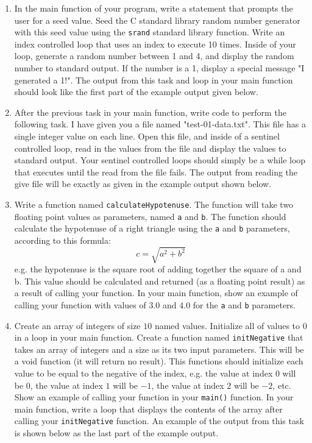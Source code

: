 \documentclass[11pt]{article}
\begin{document}
\begin{enumerate}
\item In the main function of your program, write a statement that
prompts the user for a seed value.  Seed the C standard library
random number generator with this seed value using the \verb~srand~
standard library function.  Write an index controlled loop that
uses an index to execute 10 times.  Inside of your loop, generate a
random number between 1 and 4, and display the random number to
standard output.  If the number is a 1, display a special message
"I generated a 1!".  The output from this task and loop in your
main function should look like the first part of the example
output given below.

\item After the previous task in your main function, write code to
perform the following task.  I have given you a file named
"test-01-data.txt".  This file has a single integer value
on each line.  Open this file, and inside of a sentinel 
controlled loop, read in the values from the file and
display the values to standard output.  Your sentinel
controlled loops should simply be a while loop that executes
until the read from the file fails.  The output from
reading the give file will be exactly as given in 
the example output shown below.

\item Write a function named \verb~calculateHypotenuse~.  The function 
 will take two floating point values as parameters, named \verb~a~
 and \verb~b~.  The function should calculate the hypotenuse of 
 a right triangle using the \verb~a~ and \verb~b~ parameters, according
 to this formula:
$$
  c = \sqrt{a^2 + b^2}
  $$
e.g. the hypotenuse is the square root of adding together the
square of a and b.  This value should be calculated and returned
(as a floating point result) as a result of calling your function.
In your main function, show an example of calling your function with
values of $3.0$ and $4.0$ for the \verb~a~ and \verb~b~ parameters.

\item Create an array of integers of size $10$ named values.  Initialize
all of values to $0$ in a loop in your main function.  Create a
function named \verb~initNegative~ that takes an array of integers
and a size as its two input parameters.  This will be a void
function (it will return no result).  This functions
should initialize each value to be equal to the negative
of the index, e.g. the value at index $0$ will be $0$, the
value at index $1$ will be $-1$, the value at index $2$ will be
$-2$, etc.  Show an example of calling your function in your
\verb~main()~ function.  In your main function, write a loop that
displays the contents of the array after calling your \verb~initNegative~
function.  An example of the output from this task is shown
below as the last part of the example output.
\end{enumerate}
\end{document}
